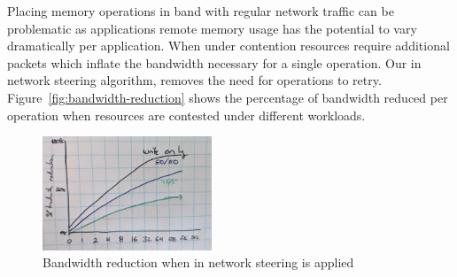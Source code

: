Placing memory operations in band with regular network traffic can be
problematic as applications remote memory usage has the potential to vary
dramatically per application. When under contention resources require additional
packets which inflate the bandwidth necessary for a single operation. Our in
network steering algorithm, removes the need for operations to retry.
Figure~\ref{fig:bandwidth-reduction} shows the percentage of bandwidth reduced
per operation when resources are contested under different workloads.

\begin{figure}
    \includegraphics[width=0.45\textwidth]{fig/bandwidth_reduction.jpg}
    \caption{{Bandwidth reduction when in network steering is applied}}
    \label{fig:bandwidth_reduction}
\end{figure}

